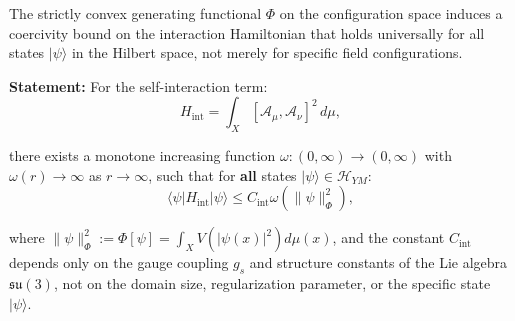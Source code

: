 






\begin{lemma}
\label{lem:divergenceCoercivityInteractionBounds}

The strictly convex generating functional $\Phi$ on the configuration space induces 
a coercivity bound on the interaction Hamiltonian that holds universally for all states $|\psi\rangle$ in the Hilbert space, not merely for specific field configurations. 

\textbf{Statement:} For the self-interaction term:
\begin{equation}
H_{\text{int}} = \int_X [\mathcal{A}_\mu, \mathcal{A}_\nu]^2 \, d\mu,
\end{equation}

there exists a monotone increasing function $\omega: (0, \infty) \to (0, \infty)$ 
with $\omega(r) \to \infty$ as $r \to \infty$, such that for \textbf{all} states $|\psi\rangle \in \mathcal{H}_{YM}$:
\begin{equation}
\langle \psi | H_{\text{int}} | \psi \rangle \leq C_{\text{int}} \omega(\|\psi\|_\Phi^2),
\end{equation}

where $\|\psi\|_\Phi^2 := \Phi[\psi] = \int_X V(|\psi(x)|^2) d\mu(x)$, and the constant $C_{\text{int}}$ depends only on the gauge coupling $g_s$ and structure constants of the Lie algebra $\mathfrak{su}(3)$, not on the domain size, regularization parameter, or the specific state $|\psi\rangle$.

\end{lemma}

